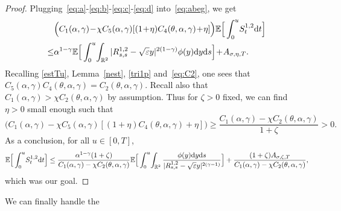 \documentclass[11pt]{article}
\newcommand{\E}{\mathbb{E}}
\newcommand{\R}{\mathbb{R}}
\newcommand{\1}{\mathbbm{1}}
\newcommand{\dd}{{\rm d}}
\newcommand{\e}{\varepsilon}
\begin{document}
\begin{proof}
Plugging~\eqref{eq:a}-\eqref{eq:b}-\eqref{eq:c}-\eqref{eq:d} into~\eqref{eq:abeg}, we get
\begin{align*}
&\Big(C_1(\alpha,\gamma)\!-\!\chi C_5(\alpha,\gamma)[(1\!+\!\eta)C_4(\theta,\alpha,\gamma)\!+\!\eta]\Big)
\E \Big[\int_0^u \!  S^{1,2}_t\dd t\Big]\\
\leq& \alpha^{1-\gamma}  \E \Big[\int_0^u\!\int_{\R^2} |R^{1,2}_{s,s}-\sqrt\e y|^{2(1-\gamma)} \phi(y)\dd y\dd s\Big]\!+\!A_{\sigma,\eta,T}.
\end{align*}
Recalling   \eqref{estTu},  Lemma~\ref{nest}, \eqref{tri1p} and~\eqref{eq:C2}, one sees that 
$C_5(\alpha,\gamma)C_4(\theta,\alpha,\gamma)=C_2(\theta,\alpha,\gamma)$.
Recall also that $C_1(\alpha,\gamma)>\chi C_2(\theta,\alpha,\gamma)$ by assumption. 
Thus for $\zeta>0$ fixed, we can find $\eta>0$ small enough such that
$$
\Big(C_1(\alpha,\gamma)\!-\!\chi C_5(\alpha,\gamma)[(1\!+\!\eta)C_4(\theta,\alpha,\gamma)\!+\!\eta]\Big)
\geq \frac{C_1(\alpha,\gamma)-\chi C_2(\theta,\alpha,\gamma)}{1+\zeta}>0.
$$
As a conclusion, for all $u\in [0,T]$,
$$
\E \Big[\int_0^u \!  S^{1,2}_t\dd t\Big] \leq 
\frac{ \alpha^{1-\gamma} (1+\zeta)}{C_1(\alpha,\gamma)-\chi C_2(\theta,\alpha,\gamma)} 
\E \Big[\int_0^u\! \int_{\R^2} \frac{\phi(y)\dd y\dd s}{|R^{1,2}_{s,s}-\sqrt\e y|^{2(\gamma-1)}}\Big]
+ \frac{(1+\zeta)A_{\sigma,\zeta,T}}{C_1(\alpha,\gamma)-\chi C_2(\theta,\alpha,\gamma)},
$$
which was our goal.
\end{proof}

We can finally handle the
\end{document}
